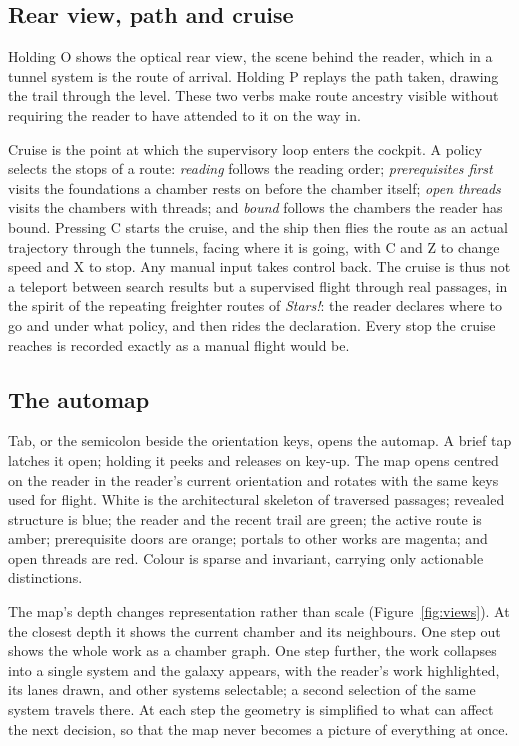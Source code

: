 \documentclass[11pt]{article}
\theoremstyle{remark}
\begin{document}
\subsection{Rear view, path and cruise}

Holding O shows the optical rear view, the scene behind the reader, which in a tunnel system is the route of arrival. Holding P replays the path taken, drawing the trail through the level. These two verbs make route ancestry visible without requiring the reader to have attended to it on the way in.

Cruise is the point at which the supervisory loop enters the cockpit. A policy selects the stops of a route: \emph{reading} follows the reading order; \emph{prerequisites first} visits the foundations a chamber rests on before the chamber itself; \emph{open threads} visits the chambers with threads; and \emph{bound} follows the chambers the reader has bound. Pressing C starts the cruise, and the ship then flies the route as an actual trajectory through the tunnels, facing where it is going, with C and Z to change speed and X to stop. Any manual input takes control back. The cruise is thus not a teleport between search results but a supervised flight through real passages, in the spirit of the repeating freighter routes of \emph{Stars!}: the reader declares where to go and under what policy, and then rides the declaration. Every stop the cruise reaches is recorded exactly as a manual flight would be.

\subsection{The automap}

Tab, or the semicolon beside the orientation keys, opens the automap. A brief tap latches it open; holding it peeks and releases on key-up. The map opens centred on the reader in the reader's current orientation and rotates with the same keys used for flight. White is the architectural skeleton of traversed passages; revealed structure is blue; the reader and the recent trail are green; the active route is amber; prerequisite doors are orange; portals to other works are magenta; and open threads are red. Colour is sparse and invariant, carrying only actionable distinctions.

The map's depth changes representation rather than scale (Figure~\ref{fig:views}). At the closest depth it shows the current chamber and its neighbours. One step out shows the whole work as a chamber graph. One step further, the work collapses into a single system and the galaxy appears, with the reader's work highlighted, its lanes drawn, and other systems selectable; a second selection of the same system travels there. At each step the geometry is simplified to what can affect the next decision, so that the map never becomes a picture of everything at once.
\end{document}
